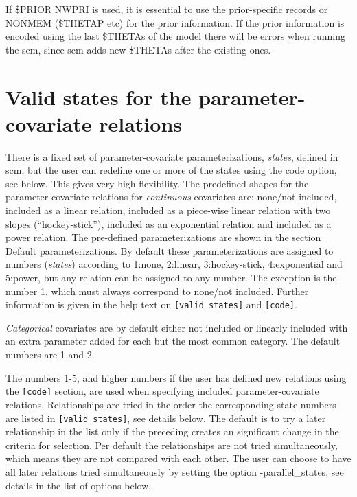 If \$PRIOR NWPRI is used, it is essential to use the prior-specific records
or NONMEM (\$THETAP etc) for the prior information. If the prior information
is encoded using the last \$THETAs of the model there will be errors when
running the scm, since scm adds new \$THETAs after the existing ones. 

\section{Valid states for the parameter-covariate relations}
There is a fixed set of parameter-covariate parameterizations, \emph{states}, 
defined in scm, but the user can redefine one or more of 
the states using the code option, see below. This gives very high flexibility. The predefined shapes for the 
parameter-covariate relations for \emph{continuous} covariates are: none/not included, included as a linear 
relation, included as a piece-wise linear relation with two slopes (“hockey-stick”), included as an exponential 
relation and included as a power relation. 
The pre-defined parameterizations are shown in the section Default parameterizations. 
By default these parameterizations are assigned to numbers (\emph{states}) 
according to 1:none,  2:linear, 3:hockey-stick, 4:exponential and 5:power, but any relation can be assigned 
to any number. 
The exception is the number 1, which must always correspond to none/not included. Further information is given in 
the help text on \verb|[valid_states]| and \verb|[code]|. 

\emph{Categorical} covariates are by default either not included or linearly included with an extra parameter added for each but the most common category. The default numbers are 1 and 2.

The numbers 1-5, and higher numbers if the user has defined new relations using the \verb|[code]| section, are 
used when specifying included parameter-covariate relations. Relationships are tried in the order the 
corresponding 
state numbers are listed in \verb|[valid_states]|, see details below. The default is to try a later 
relationship in the list only if the preceding creates an significant change in the criteria for selection. 
Per default the relationships are not tried simultaneously, which means they are not compared with each other. 
The user can choose to have all later relations tried simultaneously by setting the option -parallel\_states, see 
details in the list of options below.

